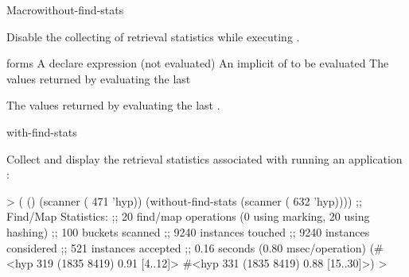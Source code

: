 \documentclass[10pt,twoside,english,pdftex]{article}
\begin{document}

\begin{functiondoc}{Macro}{without-find-stats}%
  {\superstar{}
    }
%
%
%
  
\fnsyntax

\fnpurpose 
{}%
%
Disable the collecting of retrieval statistics while executing .

\fnpackage {}

\fnmodule {}

\fnargs
\begin{args}{forms}
\arg[declaration] A declare expression (not evaluated)
\arg[forms] An implicit  of  to be evaluated
\arg[results] The values returned by evaluating the last 
\end{args}

\fnreturns The values returned by evaluating the last .

\begin{alsos}{with-find-stats}
\end{alsos}

\fnexample
{}%
%
Collect and display the retrieval statistics associated with
running an application  :
%
\W\supp
\begin{example}
> ( ()
     (scanner ( 471 'hyp))
     (without-find-stats
        (scanner ( 632 'hyp))))
  ;; Find/Map Statistics:
  ;;        20 find/map operations (0 using marking, 20 using hashing)
  ;;       100 buckets scanned
  ;;      9240 instances touched
  ;;      9240 instances considered
  ;;       521 instances accepted
  ;;      0.16 seconds (0.80 msec/operation)
  (#<hyp 319 (1835 8419) 0.91 [4..12]>
   #<hyp 331 (1835 8419) 0.88 [15..30]>)
  >
\end{example}

\end{functiondoc}

\end{document}
